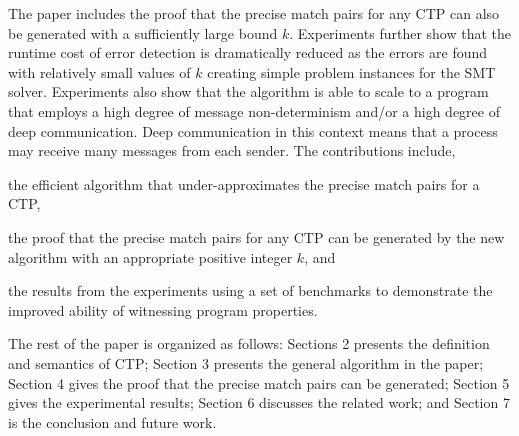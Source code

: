 The paper includes the proof that the precise match pairs for any CTP can also be generated with a sufficiently large bound $k$. 
Experiments further show that the runtime cost of error detection is dramatically reduced as the errors are found with relatively small values of $k$ creating simple problem instances for the SMT solver. 
Experiments also show that the algorithm is able to scale to a program that employs a high degree of message non-determinism and/or a high degree of deep communication.
Deep communication in this context means that a process may receive many messages from each sender.
The contributions include,
\begin{compactitem}
\item the efficient algorithm that under-approximates the precise match pairs for a CTP, 
\item the proof that the precise match pairs for any CTP can be generated by the new algorithm with an appropriate positive integer $k$, and
\item the results from the experiments using a set of benchmarks to demonstrate the improved ability of witnessing program properties.
\end{compactitem}

The rest of the paper is organized as follows: 
Sections 2 presents the definition and semantics of CTP; Section 3 presents the general algorithm in the paper; Section 4 gives the proof that the precise match pairs can be generated; Section 5 gives the experimental results; Section 6 discusses the related work; and Section 7 is the conclusion and future work.
